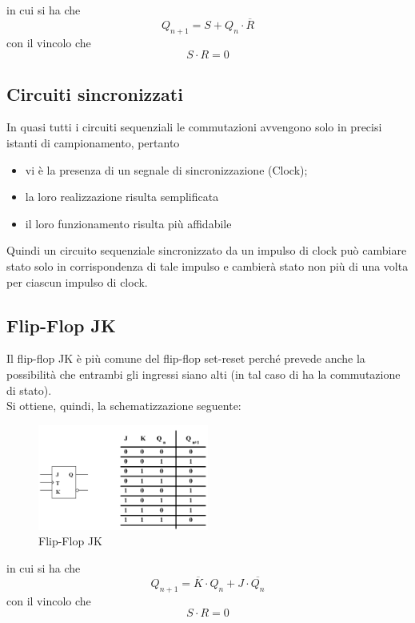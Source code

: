 \documentclass[a4paper]{extarticle}
\begin{document}
\vspace{1em}
\noindent
in cui si ha che
\[Q_{n+1} = S + Q_n \cdot \overline{R}\]
con il vincolo che
\[S \cdot R = 0\]

\vspace{1em}
\subsection{Circuiti sincronizzati}
In quasi tutti i circuiti sequenziali le commutazioni avvengono solo in precisi istanti di campionamento, pertanto
\begin{itemize}
    \item vi è la presenza di un segnale di sincronizzazione (Clock);
    \item la loro realizzazione risulta semplificata
    \item il loro funzionamento risulta più affidabile
\end{itemize}
Quindi un circuito sequenziale sincronizzato da un impulso di clock può cambiare stato solo in corrispondenza di tale impulso e cambierà stato non più di una volta per ciascun impulso di clock.

\vspace{1em}
\subsection{Flip-Flop JK}
Il flip-flop JK è più comune del flip-flop set-reset perché prevede anche la possibilità che entrambi gli ingressi siano alti (in tal caso di ha la commutazione di stato).\\
Si ottiene, quindi, la schematizzazione seguente:

\begin{figure}[H]
    \centering
    \includegraphics[width=0.5\textwidth]{flip-flop-jk.png}
    \caption{Flip-Flop JK}
    \label{fig:flip-flop-jk}
\end{figure}

\vspace{1em}
\noindent
in cui si ha che
\[Q_{n+1} = \overline{K} \cdot Q_n + J \cdot \overline{Q_n}\]
con il vincolo che
\[S \cdot R = 0\]
\end{document}

